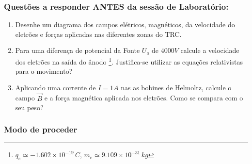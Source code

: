 \documentclass[a4paper,twoside,12pt]{article}      %
\begin{document}
\subsubsection{\sf Questões a responder ANTES da sessão de Laboratório:}
\begin{enumerate}
\item Desenhe um diagrama dos campos elétricos, magnéticos, da velocidade do eletrões e forças 
aplicadas nas diferentes zonas do TRC.
\item Para uma diferença de potencial da Fonte $U_a$  de $4000 V$ calcule a velocidade dos eletrões na saída do ânodo \footnote{$q_e \simeq  −1.602×10^{−19}\, C$, $m_e\simeq 9.109×10^{−31}\, kg$}. Justifica-se utilizar as equações relativistas para o movimento?
\item Aplicando uma corrente de $I= 1A$ nas as bobines de Helmoltz, calcule o campo $\vec{B}$ e a força magnética aplicada nos eletrões. Como se compara com o seu peso?
\end{enumerate}

\subsubsection{\sf Modo de proceder}
\end{document}
